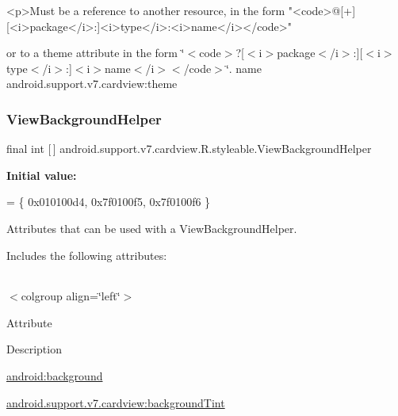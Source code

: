 \begin{DoxyVerb}      <p>Must be a reference to another resource, in the form "<code>@[+][<i>package</i>:]<i>type</i>:<i>name</i></code>"
\end{DoxyVerb}
 or to a theme attribute in the form \char`\"{}$<$code$>$?\mbox{[}$<$i$>$package$<$/i$>$\+:\mbox{]}\mbox{[}$<$i$>$type$<$/i$>$\+:\mbox{]}$<$i$>$name$<$/i$>$$<$/code$>$\char`\"{}.  name android.\+support.\+v7.\+cardview\+:theme \mbox{\label{classandroid_1_1support_1_1v7_1_1cardview_1_1R_1_1styleable_a5b548c410f0942ef83e14ce4020235ca}} 
\subsubsection{\texorpdfstring{View\+Background\+Helper}{ViewBackgroundHelper}}
{\footnotesize\ttfamily final int \mbox{[}$\,$\mbox{]} android.\+support.\+v7.\+cardview.\+R.\+styleable.\+View\+Background\+Helper\hspace{0.3cm}{\ttfamily [static]}}

{\bfseries Initial value\+:}
\begin{DoxyCode}
= \{
            0x010100d4, 0x7f0100f5, 0x7f0100f6
        \}
\end{DoxyCode}
Attributes that can be used with a View\+Background\+Helper. 

Includes the following attributes\+:

\tabulinesep=1mm
\begin{longtabu} spread 0pt [c]{*{0}{|X[-1]}|}
\hline
\end{longtabu}
$<$colgroup align=\char`\"{}left\char`\"{}$>$ 

Attribute

Description 

{\ttfamily \hyperlink{classandroid_1_1support_1_1v7_1_1cardview_1_1R_1_1styleable_a7a3a9b0fb886ee19df2600f390bc2839}{android\+:background}}

{\ttfamily \hyperlink{classandroid_1_1support_1_1v7_1_1cardview_1_1R_1_1styleable_aacbc5a77ebb6f89cb3645b863dd8b7f4}{android.\+support.\+v7.\+cardview\+:background\+Tint}}


